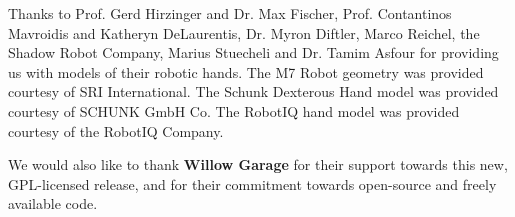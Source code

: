 Thanks to Prof. Gerd Hirzinger and Dr. Max Fischer, Prof. Contantinos
Mavroidis and Katheryn DeLaurentis, Dr. Myron Diftler, Marco Reichel,
the Shadow Robot Company, Marius Stuecheli and Dr. Tamim Asfour for
providing us with models of their robotic hands. The M7 Robot geometry
was provided courtesy of SRI International. The Schunk Dexterous Hand
model was provided courtesy of SCHUNK GmbH Co. The RobotIQ hand
model was provided courtesy of the RobotIQ Company.

We would also like to thank \textbf{Willow Garage} for their support
towards this new, GPL-licensed release, and for their commitment
towards open-source and freely available code.
